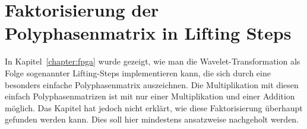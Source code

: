 %
%
%
\chapter{Faktorisierung der Polyphasenmatrix in Lifting Steps
\label{chapter:lifting}}
\rhead{}
\begin{refsection}

{\parindent 0pt
In Kapitel~\ref{chapter:fpga} wurde gezeigt, wie man die
Wavelet-Transformation als Folge sogenannter Lifting-Steps implementieren
kann, die sich durch eine besonders einfache Polyphasenmatrix auszeichnen.}
Die Multiplikation mit diesen einfach Polyphasenmatrizen ist mit nur
einer Multiplikation und einer Addition möglich.
Das Kapitel hat jedoch nicht erklärt, wie diese Faktorisierung
überhaupt gefunden werden kann.
Dies soll hier mindestens ansatzweise nachgeholt werden.




\printbibliography[heading=subbibliography]
\end{refsection}
